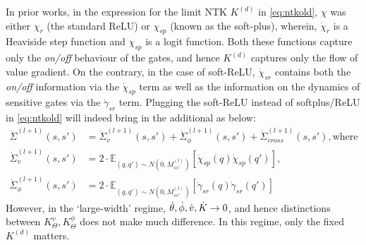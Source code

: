 In prior works, in the expression for the limit NTK $K^{(d)}$ in \eqref{eq:ntkold}, $\chi$ was either $\chi_r$ (the standard ReLU) or $\chi_{sp}$ (known as the soft-plus), wherein, $\dot{\chi}_r$ is a Heaviside step function and $\chi_{sp}$ is a logit function. Both these functions capture only the \emph{on/off} behaviour of the gates, and hence $K^{(d)}$ captures only the flow of value gradient. On the contrary, in the case of soft-ReLU, $\dot{\chi}_{sr}$ contains both the \emph{on/off} information via the $\dot{\chi}_{sp}$ term as well as the information on the dynamics of sensitive gates via the $\dot{\gamma}_{sr}$ term. Plugging the soft-ReLU instead of softplus/ReLU in \eqref{eq:ntkold} will indeed bring in the additional as below:
\begin{align*}
\dot{\Sigma}^{(l+1)}(s,s')&=\dot{\Sigma}^{(l+1)}_v(s,s')+ \dot{\Sigma}^{(l+1)}_{\phi}(s,s') + \dot{\Sigma}^{(l+1)}_{cross}(s,s'),\text{where}\\
\dot{\Sigma}^{(l+1)}_v(s,s')&=2\cdot\mathbb{E}_{(q,q')\sim N(0,M_{ss'}^{(l)})}\left[\dot{\chi}_{sp}(q)\dot{\chi}_{sp}(q')\right],\\
\dot{\Sigma}^{(l+1)}_{\phi}(s,s')&=2\cdot\mathbb{E}_{(q,q')\sim N(0,M_{ss'}^{(l)})}\left[\dot{\gamma}_{sr}(q)\dot{\gamma}_{sr}(q')\right]
\end{align*}
However, in the `large-width' regime, $\dot{\theta},\dot{\phi},\dot{v},\dot{K}\rightarrow 0$, and hence distinctions between $K^{v}_{\Theta}, K^{\phi}_{\Theta}$ does not make much difference. In this regime, only the fixed $K^{(d)}$ matters.
